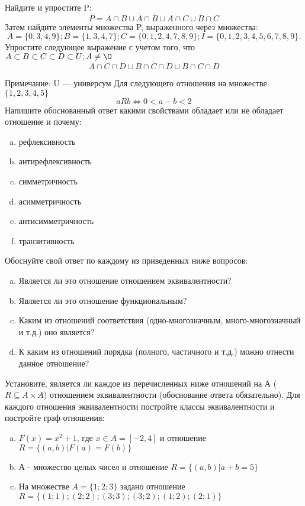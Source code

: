 \documentclass[10pt]{exam}
\begin{document}
\begin{questions}
\question
Найдите и упростите P:
\begin{equation*}
\overline{P} = A \cap B \cup \overline{A} \cap \overline{B} \cup A \cap C \cup \overline{B} \cap C
\end{equation*}
Затем найдите элементы множества P, выраженного через множества:
\begin{equation*}
A = \{0, 3, 4, 9\}; 
B = \{1, 3, 4, 7\};
C = \{0, 1, 2, 4, 7, 8, 9\};
I = \{0, 1, 2, 3, 4, 5, 6, 7, 8, 9\}.
\end{equation*}\question
Упростите следующее выражение с учетом того, что $A\subset B \subset C \subset D \subset U; A \neq \O$
\begin{equation*}
A \cap C  \cap D \cup B \cap \overline{C} \cap D \cup B \cap C \cap D
\end{equation*}

Примечание: U — универсум\question
Для следующего отношения на множестве $\{1, 2, 3, 4, 5\}$ 
\begin{equation*}
aRb \iff 0 < a-b<2
\end{equation*}
Напишите обоснованный ответ какими свойствами обладает или не обладает отношение и почему:   
\begin{enumerate} [a)]\setcounter{enumi}{0}
\item рефлексивность
\item антирефлексивность
\item симметричность
\item асимметричность
\item антисимметричность
\item транзитивность
\end{enumerate}

Обоснуйте свой ответ по каждому из приведенных ниже вопросов:
\begin{enumerate} [a)]\setcounter{enumi}{0}
    \item Является ли это отношение отношением эквивалентности?
    \item Является ли это отношение функциональным?
    \item Каким из отношений соответствия (одно-многозначным, много-многозначный и т.д.) оно является?
    \item К каким из отношений порядка (полного, частичного и т.д.) можно отнести данное отношение?
\end{enumerate}
\question
Установите, является ли каждое из перечисленных ниже отношений на А ($R \subseteq A \times A$) отношением эквивалентности (обоснование ответа обязательно). Для каждого отношения эквивалентности постройте классы эквивалентности и постройте граф отношения:
\begin{enumerate} [a)]\setcounter{enumi}{0}
\item $F(x)=x^{2}+1$, где $x \in A = [-2, 4]$ и отношение $R = \{(a,b)|F(a) = F(b)\}$
\item А - множество целых чисел и отношение $R = \{(a,b)|a + b = 5\}$
\item На множестве $A = \{1; 2; 3\}$ задано отношение $R = \{(1; 1); (2; 2); (3; 3); (3; 2); (1; 2); (2; 1)\}$


\end{enumerate}
\end{questions}
\end{document}

